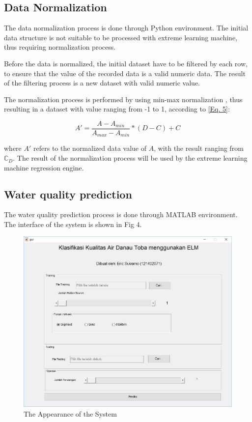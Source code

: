 \documentclass{ws-ijait}
\begin{document}
\subsection{Data Normalization}

The data normalization process is done through Python environment. The initial data structure is not suitable to be processed with extreme learning machine, thus requiring normalization process.

Before the data is normalized, the initial dataset have to be filtered by each row, to ensure that the value of the recorded data is a valid numeric data. The result of the filtering process is a new dataset with valid numeric value.

The normalization process is performed by using min-max normalization\cite{22} , thus resulting in a dataset with value ranging from -1 to 1, according to \eqref{Eq. 5}:

\begin{equation}
A' = \frac{A - A_{min}}{A_{max} - A_{min}} * (D - C) + C\label{Eq. 5}
\end{equation}

where $A'$ refers to the normalized data value of $A$, with the result ranging from $\mathbb{C}_{D}$. The result of the normalization process will be used by the extreme learning machine regression engine\cite{25}.

\subsection{Water quality prediction}

The water quality prediction process is done through MATLAB environment. The interface of the system is shown in Fig 4.

\begin{figure}
\centerline{\includegraphics[scale=0.3]{fig-4.jpg}}
\caption{The Appearance of the System}\label{Fig. 4}
\end{figure}
\end{document}

